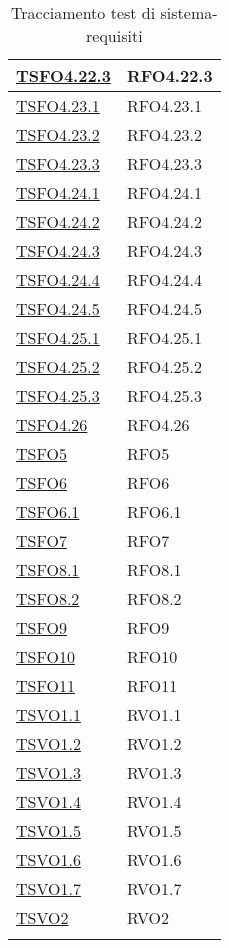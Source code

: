 \begin{longtable}{|>{\centering}m{5cm}|m{5cm}<{\centering}|}
\hyperlink{TSFO4.22.3}{TSFO4.22.3} & RFO4.22.3\\ \hline
\hyperlink{TSFO4.23.1}{TSFO4.23.1} & RFO4.23.1\\ \hline
\hyperlink{TSFO4.23.2}{TSFO4.23.2} & RFO4.23.2\\ \hline
\hyperlink{TSFO4.23.3}{TSFO4.23.3} & RFO4.23.3\\ \hline
\hyperlink{TSFO4.24.1}{TSFO4.24.1} & RFO4.24.1\\ \hline
\hyperlink{TSFO4.24.2}{TSFO4.24.2} & RFO4.24.2\\ \hline
\hyperlink{TSFO4.24.3}{TSFO4.24.3} & RFO4.24.3\\ \hline
\hyperlink{TSFO4.24.4}{TSFO4.24.4} & RFO4.24.4\\ \hline
\hyperlink{TSFO4.24.5}{TSFO4.24.5} & RFO4.24.5\\ \hline
\hyperlink{TSFO4.25.1}{TSFO4.25.1} & RFO4.25.1\\ \hline
\hyperlink{TSFO4.25.2}{TSFO4.25.2} & RFO4.25.2\\ \hline
\hyperlink{TSFO4.25.3}{TSFO4.25.3} & RFO4.25.3\\ \hline
\hyperlink{TSFO4.26}{TSFO4.26} & RFO4.26\\ \hline
\hyperlink{TSFO5}{TSFO5} & RFO5\\ \hline
\hyperlink{TSFO6}{TSFO6} & RFO6\\ \hline
\hyperlink{TSFO6.1}{TSFO6.1} & RFO6.1\\ \hline
\hyperlink{TSFO7}{TSFO7} & RFO7\\ \hline
\hyperlink{TSFO8.1}{TSFO8.1} & RFO8.1\\ \hline
\hyperlink{TSFO8.2}{TSFO8.2} & RFO8.2\\ \hline
\hyperlink{TSFO9}{TSFO9} & RFO9\\ \hline
\hyperlink{TSFO10}{TSFO10} & RFO10\\ \hline
\hyperlink{TSFO11}{TSFO11} & RFO11\\ \hline
\hyperlink{TSVO1.1}{TSVO1.1} & RVO1.1\\ \hline
\hyperlink{TSVO1.2}{TSVO1.2} & RVO1.2\\ \hline
\hyperlink{TSVO1.3}{TSVO1.3} & RVO1.3\\ \hline
\hyperlink{TSVO1.4}{TSVO1.4} & RVO1.4\\ \hline
\hyperlink{TSVO1.5}{TSVO1.5} & RVO1.5\\ \hline
\hyperlink{TSVO1.6}{TSVO1.6} & RVO1.6\\ \hline
\hyperlink{TSVO1.7}{TSVO1.7} & RVO1.7\\ \hline
\hyperlink{TSVO2}{TSVO2} & RVO2\\ \hline
\caption[Tracciamento test di sistema-requisiti]{Tracciamento test di sistema-requisiti}
\label{tabella:ts-requi}
\end{longtable}
\clearpage



